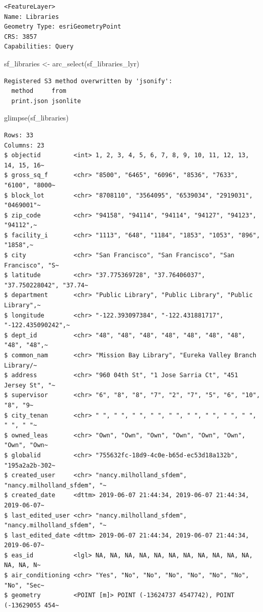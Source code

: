 \documentclass[
  letterpaper,
  DIV=11,
  numbers=noendperiod]{scrreprt}
\newenvironment{Shaded}{\begin{snugshade}}{\end{snugshade}}
\newcommand{\FunctionTok}[1]{\textcolor[rgb]{0.28,0.35,0.67}{#1}}
\newcommand{\NormalTok}[1]{\textcolor[rgb]{0.00,0.23,0.31}{#1}}
\newcommand{\OtherTok}[1]{\textcolor[rgb]{0.00,0.23,0.31}{#1}}
\begin{document}
\begin{verbatim}
<FeatureLayer>
Name: Libraries
Geometry Type: esriGeometryPoint
CRS: 3857
Capabilities: Query
\end{verbatim}

\begin{Shaded}
\begin{Highlighting}[]
\NormalTok{sf\_libraries }\OtherTok{\textless{}{-}} \FunctionTok{arc\_select}\NormalTok{(sf\_libraries\_lyr)}
\end{Highlighting}
\end{Shaded}

\begin{verbatim}
Registered S3 method overwritten by 'jsonify':
  method     from    
  print.json jsonlite
\end{verbatim}

\begin{Shaded}
\begin{Highlighting}[]
\FunctionTok{glimpse}\NormalTok{(sf\_libraries)}
\end{Highlighting}
\end{Shaded}

\begin{verbatim}
Rows: 33
Columns: 23
$ objectid         <int> 1, 2, 3, 4, 5, 6, 7, 8, 9, 10, 11, 12, 13, 14, 15, 16~
$ gross_sq_f       <chr> "8500", "6465", "6096", "8536", "7633", "6100", "8000~
$ block_lot        <chr> "8708110", "3564095", "6539034", "2919031", "0469001"~
$ zip_code         <chr> "94158", "94114", "94114", "94127", "94123", "94112",~
$ facility_i       <chr> "1113", "648", "1184", "1853", "1053", "896", "1858",~
$ city             <chr> "San Francisco", "San Francisco", "San Francisco", "S~
$ latitude         <chr> "37.775369728", "37.76406037", "37.750228042", "37.74~
$ department       <chr> "Public Library", "Public Library", "Public Library",~
$ longitude        <chr> "-122.393097384", "-122.431881717", "-122.435090242",~
$ dept_id          <chr> "48", "48", "48", "48", "48", "48", "48", "48", "48",~
$ common_nam       <chr> "Mission Bay Library", "Eureka Valley Branch Library/~
$ address          <chr> "960 04th St", "1 Jose Sarria Ct", "451 Jersey St", "~
$ supervisor       <chr> "6", "8", "8", "7", "2", "7", "5", "6", "10", "8", "9~
$ city_tenan       <chr> " ", " ", " ", " ", " ", " ", " ", " ", " ", " ", " "~
$ owned_leas       <chr> "Own", "Own", "Own", "Own", "Own", "Own", "Own", "Own~
$ globalid         <chr> "755632fc-18d9-4c0e-b65d-ec53d18a132b", "195a2a2b-302~
$ created_user     <chr> "nancy.milholland_sfdem", "nancy.milholland_sfdem", "~
$ created_date     <dttm> 2019-06-07 21:44:34, 2019-06-07 21:44:34, 2019-06-07~
$ last_edited_user <chr> "nancy.milholland_sfdem", "nancy.milholland_sfdem", "~
$ last_edited_date <dttm> 2019-06-07 21:44:34, 2019-06-07 21:44:34, 2019-06-07~
$ eas_id           <lgl> NA, NA, NA, NA, NA, NA, NA, NA, NA, NA, NA, NA, NA, N~
$ air_conditioning <chr> "Yes", "No", "No", "No", "No", "No", "No", "No", "Sec~
$ geometry         <POINT [m]> POINT (-13624737 4547742), POINT (-13629055 454~
\end{verbatim}
\end{document}
